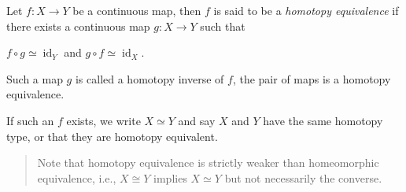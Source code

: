 \begin{definition}

\end{definition}


\begin{definition}

Let \(f: X \to Y\) be a continuous map, then \(f\) is said to be a
\emph{homotopy equivalence} if there exists a continuous map
\(g: X \to Y\) such that

\(f\circ g \simeq\operatorname{id}_Y\) and
\(g\circ f \simeq\operatorname{id}_X\).

Such a map \(g\) is called a homotopy inverse of \(f\), the pair of maps
is a homotopy equivalence.

If such an \(f\) exists, we write \(X \simeq Y\) and say \(X\) and \(Y\)
have the same homotopy type, or that they are homotopy equivalent.

\begin{quote}
Note that homotopy equivalence is strictly weaker than homeomorphic
equivalence, i.e., \(X\cong Y\) implies \(X \simeq Y\) but not
necessarily the converse.
\end{quote}

\end{definition}

\begin{definition}

\end{definition}


\begin{definition}

\end{definition}


\begin{definition}

\end{definition}


